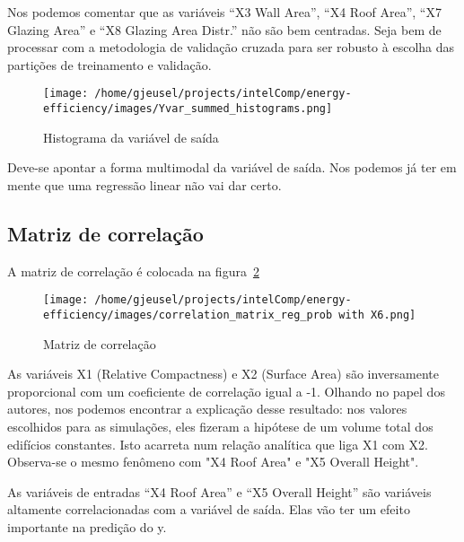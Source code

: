 \documentclass[paper=a4, fontsize=11pt]{article} %
\numberwithin{equation}{section} %
\numberwithin{figure}{section} %
\numberwithin{table}{section} %
\begin{document}
Nos podemos comentar que as variáveis “X3 Wall Area”, “X4 Roof Area”, “X7 Glazing Area” e “X8 Glazing Area Distr.” não são bem centradas.
Seja bem de processar com a metodologia de validação cruzada para ser robusto à escolha das partições de treinamento e validação.

  \begin{figure}[H] %
  \begin{center}
  \texttt{[image: /home/gjeusel/projects/intelComp/energy-efficiency/images/Yvar\_summed\_histograms.png]}
  \end{center}
  \caption{Histograma da variável de saída}
  \label{hist_Y}
  \end{figure}

Deve-se apontar a forma multimodal da variável de saída.
Nos podemos já ter em mente que uma regressão linear não vai dar certo.


\subsection{Matriz de correlação}
A matriz de correlação é colocada na figura~\ref{correlation_matrix}

\begin{figure}[H] %
\begin{center}
\texttt{[image: /home/gjeusel/projects/intelComp/energy-efficiency/images/correlation\_matrix\_reg\_prob with X6.png]}
\end{center}
\caption{Matriz de correlação}
\label{correlation_matrix}
\end{figure}

As variáveis X1 (Relative Compactness) e X2 (Surface Area) são inversamente proporcional com um coeficiente de correlação igual a -1.
Olhando no papel dos autores, nos podemos encontrar a explicação desse resultado:
nos valores escolhidos para as simulações, eles fizeram a hipótese de um volume total dos edifícios constantes.
Isto acarreta num relação analítica que liga X1 com X2.
Observa-se o mesmo fenômeno com "X4 Roof Area" e "X5 Overall Height".

As variáveis de entradas “X4 Roof Area” e “X5 Overall Height” são variáveis altamente correlacionadas com a variável de saída.
Elas vão ter um efeito importante na predição do y.
\end{document}
